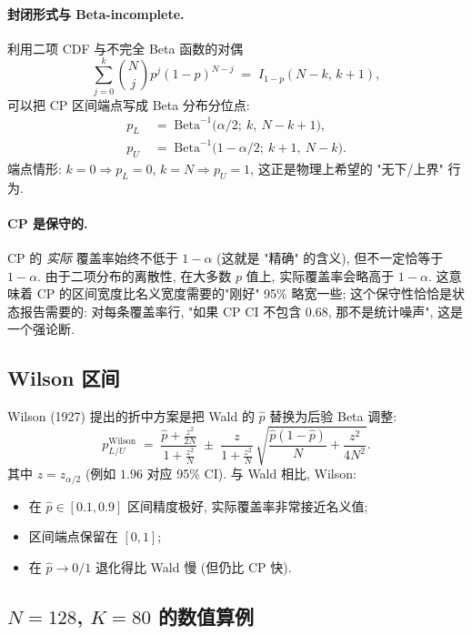 \paragraph{封闭形式与 Beta-incomplete.}
利用二项 CDF 与不完全 Beta 函数的对偶
\[
  \sum_{j=0}^{k}\binom{N}{j} p^j (1-p)^{N-j} \;=\; I_{1-p}(N-k,\, k+1),
\]
可以把 CP 区间端点写成 Beta 分布分位点:
\begin{align}
  p_L &\;=\; \mathrm{Beta}^{-1}\!\bigl(\alpha/2;\ k,\ N - k + 1\bigr), \\
  p_U &\;=\; \mathrm{Beta}^{-1}\!\bigl(1 - \alpha/2;\ k + 1,\ N - k\bigr).
\end{align}
端点情形: $k = 0 \Rightarrow p_L = 0$, $k = N \Rightarrow p_U = 1$, 这正是物理上希望的 "无下/上界" 行为.

\paragraph{CP 是保守的.}
CP 的 \emph{实际} 覆盖率始终不低于 $1 - \alpha$ (这就是 "精确" 的含义), 但不一定恰等于 $1 - \alpha$. 由于二项分布的离散性, 在大多数 $p$ 值上, 实际覆盖率会略高于 $1 - \alpha$. 这意味着 CP 的区间宽度比名义宽度需要的"刚好" 95\% 略宽一些; 这个保守性恰恰是状态报告需要的: 对每条覆盖率行, "如果 CP CI 不包含 0.68, 那不是统计噪声", 这是一个强论断.

\subsection{Wilson 区间}
\label{sec:partIII:coverage_methodology:wilson}

Wilson (1927) 提出的折中方案是把 Wald 的 $\hat p$ 替换为后验 Beta 调整:
\[
  p_{L/U}^{\mathrm{Wilson}} \;=\;
  \frac{\hat p + \tfrac{z^2}{2N}}{1 + \tfrac{z^2}{N}}
  \;\pm\;
  \frac{z}{1 + \tfrac{z^2}{N}}\,
  \sqrt{\frac{\hat p (1 - \hat p)}{N} + \frac{z^2}{4 N^2}}.
\]
其中 $z = z_{\alpha/2}$ (例如 $1.96$ 对应 95\% CI). 与 Wald 相比, Wilson:
\begin{itemize}[nosep]
  \item 在 $\hat p \in [0.1, 0.9]$ 区间精度极好, 实际覆盖率非常接近名义值;
  \item 区间端点保留在 $[0, 1]$;
  \item 在 $\hat p \to 0/1$ 退化得比 Wald 慢 (但仍比 CP 快).
\end{itemize}

\subsection{$N=128$, $K=80$ 的数值算例}
\label{sec:partIII:coverage_methodology:example}

